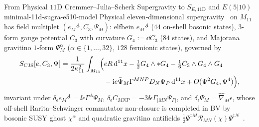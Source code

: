 \begin{zkmodule}{From Physical $11\mathrm{D}$ Cremmer--Julia--Scherk Supergravity to $S_{E,11\mathrm{D}}$ and $E(5|10)$}{minimal-11d-sugra-e510-model}
Physical eleven-dimensional supergravity~\cite{CJS78} on $M_{11}$ has field multiplet $(e_M{}^{\underline{A}}, C_3, \Psi_M)$: elfbein $e_M{}^{\underline{A}}$ ($44$ on-shell bosonic states), $3$-form gauge potential $C_3$ with curvature $G_4 := \dd C_3$ ($84$ states), and Majorana gravitino $1$-form $\Psi_M^\alpha$ ($\alpha \in \{1,\dots,32\}$, $128$ fermionic states), governed by
\begin{equation}
\label{eq:cjs-action}
\begin{aligned}
S_{\mathrm{CJS}}[e,C_3,\Psi] = \frac{1}{2\kappa_{11}^2}\int_{M_{11}}\!\Bigl(&eR\,\mathrm{d}^{11}x - \tfrac{1}{2}G_4\wedge *G_4 - \tfrac{1}{6}C_3\wedge G_4\wedge G_4\\
&-\mathrm{i} e\bar{\Psi}_M\Gamma^{MNP}D_N\Psi_P\,\mathrm{d}^{11}x + O(\Psi^2 G_4, \Psi^4)\Bigr),
\end{aligned}
\end{equation}
invariant under $\delta_\epsilon e_M{}^{\underline{A}} = \ii\bar{\epsilon}\Gamma^{\underline{A}}\Psi_M$, $\delta_\epsilon C_{MNP} = -3\ii\bar{\epsilon}\Gamma_{[MN}\Psi_{P]}$, and $\delta_\epsilon\Psi_M = \widehat{\nabla}_M\epsilon$, whose off-shell Rarita--Schwinger commutator non-closure is completed in BV by bosonic SUSY ghost $\chi^\alpha$ and quadratic gravitino antifields $\frac{1}{2}\Psi^{\ddagger M}\mathcal{R}_{MN}(\chi)\Psi^{\ddagger N}$~\cite{Cederwall10,RSW21}.
\end{zkmodule}

